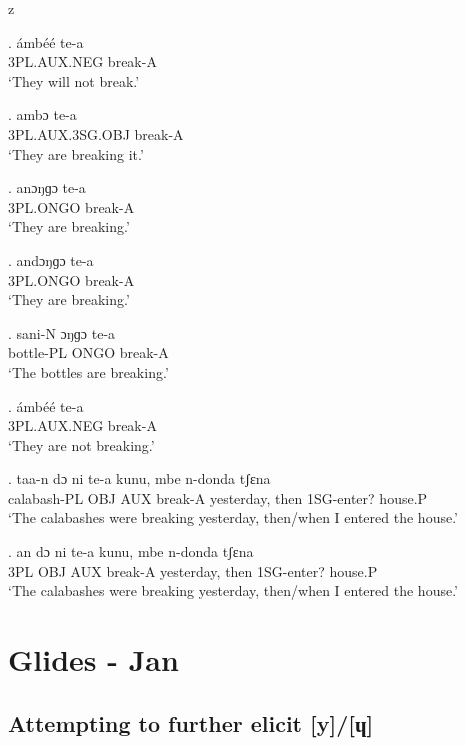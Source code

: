 z   \documentclass{assets/fieldnotes}
\begin{document}
\exg.
ámbéé         te-a    \\
3PL.AUX.NEG   break-A \\%
`They will not break.' \label{They will not break}

\exg.
ambɔ              te-a    \\
3PL.AUX.3SG.OBJ   break-A \\%
`They are breaking it.'

\exg.
anɔŋɡɔ     te-a    \\
3PL.ONGO   break-A \\%
`They are breaking.'

\exg.
andɔŋɡɔ    te-a    \\
3PL.ONGO   break-A \\%
`They are breaking.'

\exg.
sani-N      ɔŋɡɔ   te-a    \\
bottle-PL   ONGO   break-A \\%
`The bottles are breaking.' \label{The bottles are breaking}


\exg.
ámbéé         te-a    \\
3PL.AUX.NEG   break-A \\%
`They are not breaking.' \label{They are not breaking}


\exg.
taa-n         dɔ    ni    te-a      kunu,        mbe    n-donda      tʃɛna   \\
calabash-PL   OBJ   AUX   break-A   yesterday,   then   1SG-enter?   house.P \\%
`The calabashes were breaking yesterday, then/when I entered the house.'

\exg.
an    dɔ    ni    te-a      kunu,        mbe    n-donda      tʃɛna   \\
3PL   OBJ   AUX   break-A   yesterday,   then   1SG-enter?   house.P \\%
`The calabashes were breaking yesterday, then/when I entered the house.'


\section{Glides - Jan}

\subsection{Attempting to further elicit [y]/[ɥ]}
\end{document}
